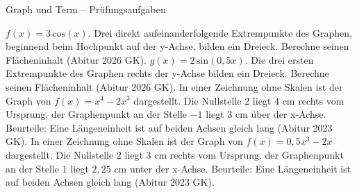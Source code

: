 \begin{aufgabe}{Graph und Term – Prüfungsaufgaben}
\begin{teile}
\teil $f(x) = 3\,\mathrm{cos}(x)$. Drei direkt aufeinanderfolgende Extrempunkte des Graphen, beginnend beim Hochpunkt auf der y-Achse, bilden ein Dreieck. Berechne seinen Flächeninhalt \hfill (Abitur 2026 GK).
\teil $g(x) = 2\,\mathrm{sin}(0{,}5x)$. Die drei ersten Extrempunkte des Graphen rechts der y-Achse bilden ein Dreieck. Berechne seinen Flächeninhalt \hfill (Abitur 2026 GK).
\teil In einer Zeichnung ohne Skalen ist der Graph von $f(x) = x^4 - 2x^3$ dargestellt. Die Nullstelle $2$ liegt $4$ cm rechts vom Ursprung, der Graphenpunkt an der Stelle $-1$ liegt $3$ cm über der x-Achse. Beurteile: Eine Längeneinheit ist auf beiden Achsen gleich lang \hfill (Abitur 2023 GK).
\teil In einer Zeichnung ohne Skalen ist der Graph von $f(x) = 0{,}5x^3 - 2x$ dargestellt. Die Nullstelle $2$ liegt $3$ cm rechts vom Ursprung, der Graphenpunkt an der Stelle $1$ liegt $2{,}25$ cm unter der x-Achse. Beurteile: Eine Längeneinheit ist auf beiden Achsen gleich lang \hfill (Abitur 2023 GK).
\end{teile}
\end{aufgabe}
